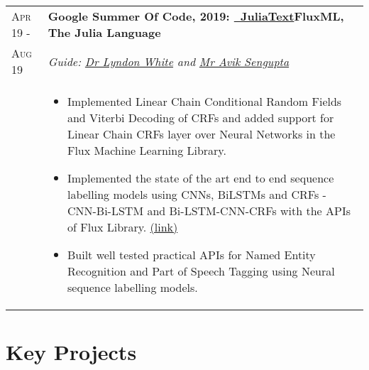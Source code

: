 \documentclass[a4paper,10pt]{extarticle} %
\begin{document}
\begin{tabularx}{\linewidth}{ l | X }

\textsc{Apr 19 -} & \textbf{Google Summer Of Code, 2019: {\href{https://github.com/JuliaText}{\ JuliaText}}}\hfill\textbf{FluxML, The Julia Language}\\
    \textsc{Aug 19}& {\textit{Guide: \href{https://www.linkedin.com/in/lyndon-white-46b9a035/}{Dr Lyndon White} and \href{https://www.linkedin.com/in/aviks}{Mr Avik Sengupta}}} \\
    & \begin{itemize}[leftmargin=.1in]
        \item Implemented Linear Chain Conditional Random Fields and Viterbi Decoding of CRFs and added support for  Linear Chain CRFs layer over Neural Networks in the Flux Machine Learning Library.
        \item Implemented the state of the art end to end sequence labelling models using CNNs, BiLSTMs and CRFs - CNN-Bi-LSTM and Bi-LSTM-CNN-CRFs with the APIs of Flux Library.  \href{https://github.com/Ayushk4/NER.jl/tree/master/Sequence_models}{(link)}
        \item Built well tested practical APIs for Named Entity Recognition and Part of Speech Tagging using Neural sequence labelling models.
    \end{itemize}
\end{tabularx}

\section{\textcolor{primary}{Key Projects}}
\end{document}
